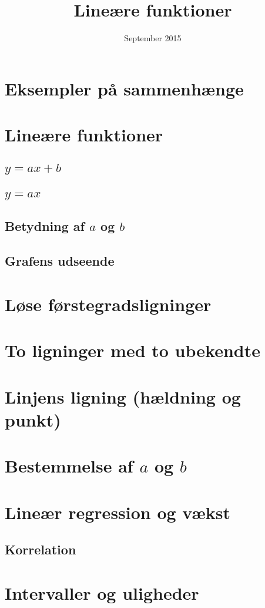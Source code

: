 \documentclass[12pt,oneside,a4paper]{article}
\title{Lineære funktioner}
\date{September 2015}
\begin{document}
\maketitle

\section{Eksempler på sammenhænge}
\section{Lineære funktioner}
\subsection{$y=ax+b$}
\subsection{$y=ax$}
\subsection{Betydning af $a$ og $b$}
\subsection{Grafens udseende}
\section{Løse førstegradsligninger}
\section{To ligninger med to ubekendte}
\section{Linjens ligning (hældning og punkt)}
\section{Bestemmelse af $a$ og $b$}
\section{Lineær regression og vækst}
\subsection{Korrelation}
\section{Intervaller og uligheder}
\end{document}
